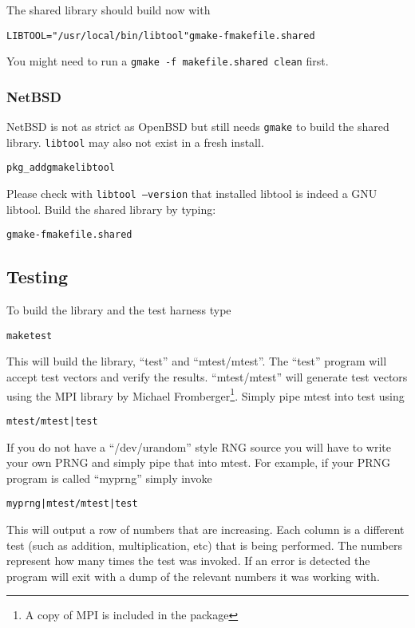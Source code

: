 \documentclass[synpaper]{book}
\begin{document}
The shared library should build now with
\begin{alltt}
LIBTOOL="/usr/local/bin/libtool" gmake -f makefile.shared
\end{alltt}
You might need to run a \texttt{gmake -f makefile.shared clean} first.

\subsubsection{NetBSD}
NetBSD is not as strict as OpenBSD but still needs \texttt{gmake} to build the shared library. \texttt{libtool} may also not exist in a fresh install.
\begin{alltt}
pkg_add gmake libtool
\end{alltt}
Please check with \texttt{libtool --version} that installed libtool is indeed a GNU libtool.
Build the shared library by typing:
\begin{alltt}
gmake -f makefile.shared
\end{alltt}

\subsection{Testing}
To build the library and the test harness type

\begin{alltt}
make test
\end{alltt}

This will build the library, ``test'' and ``mtest/mtest''.  The ``test'' program will accept test vectors and verify the
results.  ``mtest/mtest'' will generate test vectors using the MPI library by Michael Fromberger\footnote{A copy of MPI
is included in the package}.  Simply pipe mtest into test using

\begin{alltt}
mtest/mtest | test
\end{alltt}

If you do not have a ``/dev/urandom'' style RNG source you will have to write your own PRNG and simply pipe that into
mtest.  For example, if your PRNG program is called ``myprng'' simply invoke

\begin{alltt}
myprng | mtest/mtest | test
\end{alltt}

This will output a row of numbers that are increasing.  Each column is a different test (such as addition, multiplication, etc)
that is being performed.  The numbers represent how many times the test was invoked.  If an error is detected the program
will exit with a dump of the relevant numbers it was working with.
\end{document}
